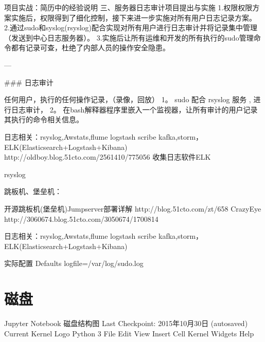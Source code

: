项目实战：简历中的经验说明
三、服务器日志审计项目提出与实施
1.权限权限方案实施后，权限得到了细化控制，接下来进一步实施对所有用户日志记录方案。
2.通过sudo和syslog(rsyslog)配合实现对所有用户进行日志审计并将记录集中管理（发送到中心日志服务器）。
3.实施后让所有运维和开发的所有执行的sudo管理命令都有记录可查，杜绝了内部人员的操作安全隐患。


---

### 日志审计

任何用户，执行的任何操作记录，（录像，回放）
1。 sudo 配合 rsyslog 服务 , 进行日志审计，
2。 在bash解释器程序里嵌入一个监视器，让所有审计的用户记录其执行的命令相关信息。



日志相关：rsyslog,Awstats,flume logstash scribe kafka,storm，ELK(Elasticsearch+Logstash+Kibana)
http://oldboy.blog.51cto.com/2561410/775056
收集日志软件ELK

rsyslog


跳板机、堡垒机：

开源跳板机(堡垒机)Jumpserver部署详解
http://blog.51cto.com/zt/658
CrazyEye
http://3060674.blog.51cto.com/3050674/1700814


日志相关：rsyslog,Awstats,flume logstash scribe kafka,storm，ELK(Elasticsearch+Logstash+Kibana)

实际配置
Defaults        logfile=/var/log/sudo.log

\section{磁盘}
Jupyter Notebook
磁盘结构图
Last Checkpoint: 2015年10月30日
(autosaved)
Current Kernel Logo
Python 3
File
Edit
View
Insert
Cell
Kernel
Widgets
Help


